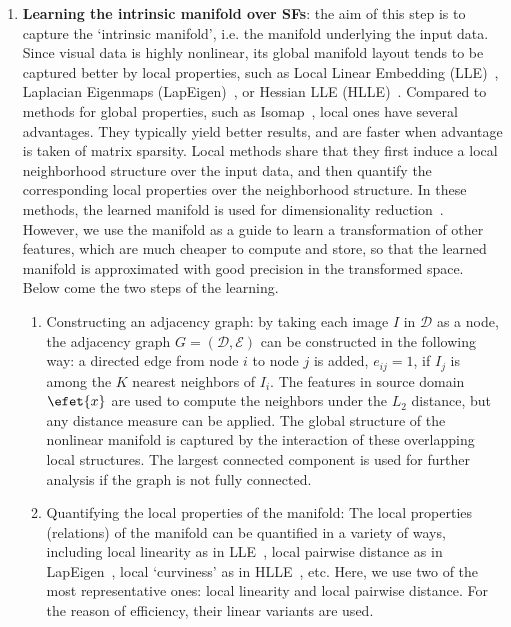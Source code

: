\begin{enumerate} [leftmargin=4.5mm]
\item \textbf{Learning the intrinsic manifold over SFs}: the aim of
  this step is to capture the `intrinsic manifold', i.e. the manifold
  underlying the input data. Since visual data is highly nonlinear, 
  its global manifold layout tends to be captured better by local 
  properties, such as Local Linear Embedding (LLE)~\citep{lle:science00}, 
  Laplacian Eigenmaps (LapEigen)~\citep{eigenmaps:nips01}, or Hessian 
  LLE (HLLE)~\citep{hlle}. Compared to methods for global properties, such
  as Isomap~\citep{isomap:00}, local ones have several advantages. They
  typically yield better results, and are faster when advantage is taken 
  of matrix sparsity. Local methods share that they first induce a
  local neighborhood structure over the input data, and then quantify
  the corresponding local properties over the neighborhood
  structure. In these methods, the learned manifold is used for
  dimensionality reduction~\citep{lle:science00, eigenmaps:nips01,
    hlle}. However, we use the manifold as a guide to learn a
  transformation of other features, which are much cheaper to compute
  and store, so that the learned manifold is approximated with good
  precision in the transformed space. Below come the two steps of
  the learning.
 
 \begin{enumerate} [leftmargin=5mm]
 \item Constructing an adjacency graph: by taking each image $I$ in
   $\mathcal{D}$ as a node, the adjacency graph $G = (\mathcal{D},
   \mathcal{E})$ can be constructed in the following way: a directed
   edge from node $i$ to node $j$ is added, \ie $e_{ij}=1$, if $I_j$
   is among the $K$ nearest neighbors of $I_i$. The features in source
   domain $\efet{x}$ are used to compute the neighbors under the $L_2$
   distance, but any distance measure can be applied. The global
   structure of the nonlinear manifold is captured by the interaction
   of these overlapping local structures. The largest connected
   component is used for further analysis if the graph is not fully
   connected.
   
 \item Quantifying the local properties of the manifold: The local
   properties (relations) of the manifold can be quantified in a variety
   of ways, including local linearity as in
   LLE~\citep{lle:science00, NPEmbedding:iccv05}, local pairwise
   distance as in LapEigen~\citep{eigenmaps:nips01}, local `curviness' as in
   HLLE~\citep{hlle}, etc. Here, we use two of
   the most representative ones: local linearity and local pairwise
   distance. For the reason of efficiency, their linear variants are
   used.
   

\end{enumerate}
\end{enumerate}

